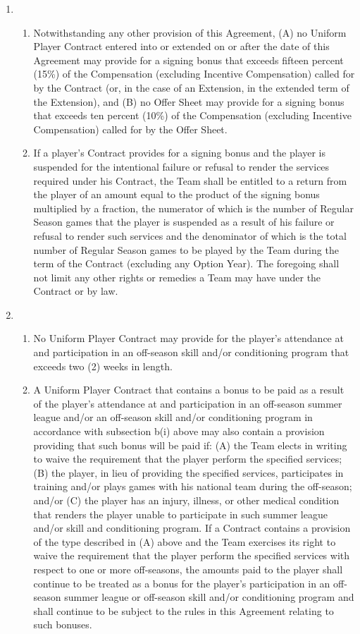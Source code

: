 \documentclass[
]{book}
\providecommand{\tightlist}{%
  \setlength{\itemsep}{0pt}\setlength{\parskip}{0pt}}
\begin{document}
\begin{enumerate}
\def\labelenumi{(\alph{enumi})}
\item
  \begin{enumerate}
  \def\labelenumii{(\roman{enumii})}
  \tightlist
  \item
    Notwithstanding any other provision of this Agreement, (A) no Uniform Player Contract entered into or extended on or after the date of this Agreement may provide for a signing bonus that exceeds fifteen percent (15\%) of the Compensation (excluding Incentive Compensation) called for by the Contract (or, in the case of an Extension, in the extended term of the Extension), and (B) no Offer Sheet may provide for a signing bonus that exceeds ten percent (10\%) of the Compensation (excluding Incentive Compensation) called for by the Offer Sheet.
  \item
    If a player's Contract provides for a signing bonus and the player is suspended for the intentional failure or refusal to render the services required under his Contract, the Team shall be entitled to a return from the player of an amount equal to the product of the signing bonus multiplied by a fraction, the numerator of which is the number of Regular Season games that the player is suspended as a result of his failure or refusal to render such services and the denominator of which is the total number of Regular Season games to be played by the Team during the term of the Contract (excluding any Option Year). The foregoing shall not limit any other rights or remedies a Team may have under the Contract or by law.
  \end{enumerate}
\item
  \begin{enumerate}
  \def\labelenumii{(\roman{enumii})}
  \tightlist
  \item
    No Uniform Player Contract may provide for the player's attendance at and participation in an off-season skill and/or conditioning program that exceeds two (2) weeks in length.
  \item
    A Uniform Player Contract that contains a bonus to be paid as a result of the player's attendance at and participation in an off-season summer league and/or an off-season skill and/or conditioning program in accordance with subsection b(i) above may also contain a provision providing that such bonus will be paid if: (A) the Team elects in writing to waive the requirement that the player perform the specified services; (B) the player, in lieu of providing the specified services, participates in training and/or plays games with his national team during the off-season; and/or (C) the player has an injury, illness, or other medical condition that renders the player unable to participate in such summer league and/or skill and conditioning program. If a Contract contains a provision of the type described in (A) above and the Team exercises its right to waive the requirement that the player perform the specified services with respect to one or more off-seasons, the amounts paid to the player shall continue to be treated as a bonus for the player's participation in an off-season summer league or off-season skill and/or conditioning program and shall continue to be subject to the rules in this Agreement relating to such bonuses.

\end{enumerate}
\end{enumerate}
\end{document}
